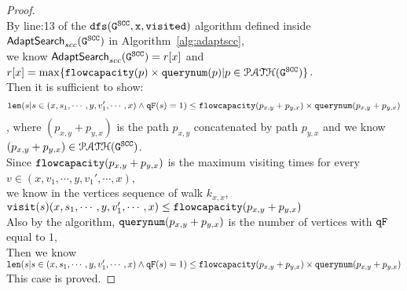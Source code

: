 \begin{proof}
$$  $$
  By line:13 of the $\mathtt{dfs(\mathtt{G^{SCC}}, x, visited)}$ algorithm defined inside $\mathsf{AdaptSearch}_{scc}(\mathtt{G^{SCC}})$ in Algorithm~\ref{alg:adaptscc},
  \\
  we know $\mathsf{AdaptSearch}_{scc}(\mathtt{G^{SCC}}) = r[x]$ and
  $r[x] = \max\{\mathtt{flowcapacity}(p) \times \mathtt{querynum}(p) | p \in \mathcal{PATH}(\mathtt{G^{SCC}})\}$.
  \\
  Then it is sufficient to show: 
  $$ 
  \mathtt{len}(s | s \in (x, s_1, \cdots, y, v_1', \cdots, x) \land \mathtt{qF}(s) = 1) \leq \mathtt{flowcapacity}(p_{x, y} + p_{y, x}) \times \mathtt{querynum}(p_{x, y} + p_{y, x}) 
  $$
  , where $(p_{x, y} + p_{y, x})$ is the path $p_{x, y}$ concatenated by path $p_{y, x}$ and we know $(p_{x, y} + p_{y, x}) \in \mathcal{PATH}(\mathtt{G^{SCC}})$.
  \\
Since $\mathtt{flowcapacity}(p_{x, y} + p_{y, x})$ is the maximum visiting times for every $v \in (x, v_1, \cdots, y, v_1', \cdots, x)$, 
\\
we know in the vertices sequence of walk $k_{x,x}$, 
$\mathtt{visit}(s) (x, s_1, \cdots, y, v_1', \cdots, x)  \leq \mathtt{flowcapacity}(p_{x, y} + p_{y, x})$
  \\
  Also by the algorithm, $\mathtt{querynum}(p_{x, y} + p_{y, x})$ is the number of vertices with $\mathtt{qF}$ equal to $1$,
  \\
  Then we know 
  \\
  $\mathtt{len}(s | s \in (x, s_1, \cdots, y, v_1', \cdots, x) \land \mathtt{qF}(s) = 1) \leq \mathtt{flowcapacity}(p_{x, y} + p_{y, x}) \times \mathtt{querynum}(p_{x, y} + p_{y, x}) $
  \\
  This case is proved.
%
%
\end{proof}